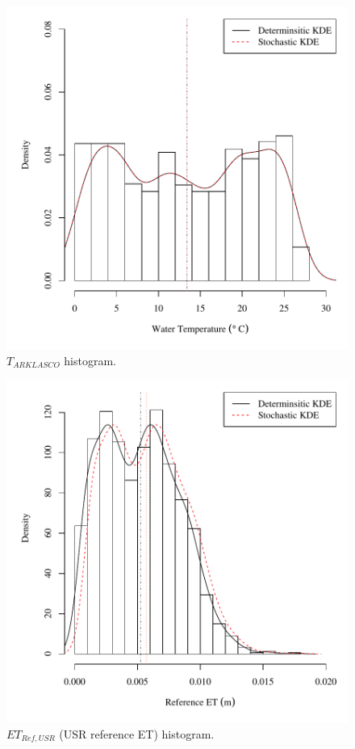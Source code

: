\begin{center}
\begin{figure}[htbp]
	\includegraphics[width=6in]{"Figures/Results_USR/V density tout"}
	\caption{$T_{ARKLASCO}$ histogram.}
\end{figure}
\end{center}
\newpage

\begin{center}
\begin{figure}[htbp]
	\includegraphics[width=6in]{"Figures/Results_USR/V density et"}
	\caption{$ET_{Ref,USR}$ (USR reference ET) histogram.}
\end{figure}
\end{center}
\newpage

